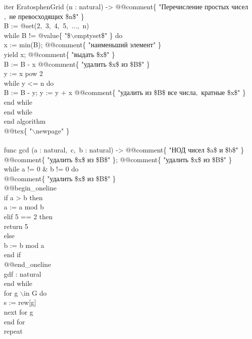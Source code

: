 iter EratosphenGrid (n : natural) -> @@comment\{ "Перечисление простых чисел$,$ не превосходящих \$n\$" \} \\
\tb B := @set(2$,$ 3$,$ 4$,$ 5$,$ ...$,$ n) \\
\tb while B != @value\{ "\$$\backslash$emptyset\$" \} do \\
\tb \tb x := min(B); @@comment\{ "наименьший элемент" \} \\
\tb \tb yield x; @@comment\{ "выдать \$x\$" \} \\
\tb \tb B := B - x @@comment\{ "удалить \$x\$ из \$B\$" \} \\
\tb \tb y := x pow 2 \\
\tb \tb while y <= n do \\
\tb \tb \tb B := B - y; y := y + x @@comment\{ "удалить из \$B\$ все числа$,$ кратные \$x\$" \} \\
\tb \tb end while \\
\tb end while \\
end algorithm \\
\tb @@tex\{ "$\backslash$newpage" \} \\
\\
func gcd (a : natural$,$ c$,$ b : natural) -> @@comment\{ "НОД чисел \$a\$ и \$b\$" \} \\
\tb @@comment\{ "удалить \$x\$ из \$B\$" \}; @@comment\{ "удалить \$x\$ из \$B\$" \} \\
\tb while a != 0 \& b != 0 do \\
\tb \tb @@comment\{ "удалить \$x\$ из \$B\$" \} \\
\tb \tb @@begin\_oneline \\
\tb \tb if a > b then \\
\tb \tb \tb a := a mod b \\
\tb \tb elif 5 == 2 then \\
\tb \tb \tb return 5 \\
\tb \tb else \\
\tb \tb \tb b := b mod a \\
\tb \tb end if \\
\tb \tb @@end\_oneline \\
\tb \tb gdf : natural \\
\tb end while \\
\tb for g $\backslash$in G do \\
\tb \tb s := rew[g] \\
\tb \tb next for g \\
\tb end for \\
\tb repeat \\
